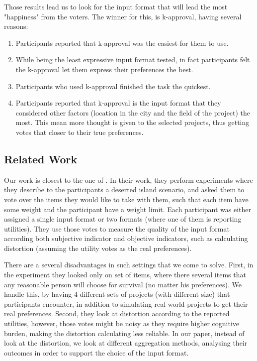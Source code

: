 \documentclass[10pt]{article}
\begin{document}
Those results lead us to look for the input format that will lead the most "happiness" from the voters. The winner for this, is k-approval, having several reasons:
\begin{enumerate}
    \item Participants reported that k-approval was the easiest for them to use.
    \item While being the least expressive input format tested, in fact participants felt the k-approval let them express their preferences the best.
    \item Participants who used k-approval finished the task the quickest.
    \item Participants reported that k-approval is the input format that they considered other factors (location in the city and the field of the project) the most. This mean more thought is given to the selected projects, thus getting votes that closer to their true preferences. 
\end{enumerate}


\subsection{Related Work}
Our work is closest to the one of \citet{benade2018efficiency}. In their work, they perform experiments where they describe to the participants a deserted island scenario, and asked them to vote over the items they would like to take with them, such that each item have some weight and the participant have a weight limit. Each participant was either assigned a single input format or two formats (where one of them is reporting utilities). They use those votes to measure the quality of the input format according both subjective indicator and objective indicators, such as calculating distortion (assuming the utility votes as the real preferences). 

There are a several disadvantages in such settings that we come to solve. First, in the experiment they looked only on set of items, where there several items that any reasonable person will choose for survival (no matter his preferences). We handle this, by having 4 different sets of projects (with different size) that participants encounter, in addition to simulating real world projects to get their real preferences. Second, they look at distortion according to the reported utilities, however, those votes might be noisy as they require higher cognitive burden, making the distortion calculating less reliable. In our paper, instead of look at the distortion, we look at different aggregation methods, analysing their outcomes in order to support the choice of the input format.
\end{document}
